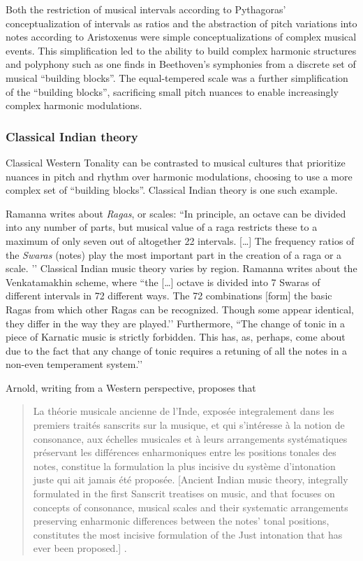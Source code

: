 Both the restriction of musical intervals according to Pythagoras' conceptualization of intervals as ratios and the abstraction of pitch variations into notes according to Aristoxenus were simple conceptualizations of complex musical events. This simplification led to the ability to build complex harmonic structures and polyphony such as one finds in Beethoven's symphonies from a discrete set of musical ``building blocks''. The equal-tempered scale was a further simplification of the ``building blocks'', sacrificing small pitch nuances to enable increasingly complex harmonic modulations. 

\subsubsection{Classical Indian theory}
Classical Western Tonality can be contrasted to musical cultures that prioritize nuances in pitch and rhythm over harmonic modulations, choosing to use a more complex set of ``building blocks''. Classical Indian theory is one such example. 

Ramanna writes about \textit{Ragas}, or scales: ``In principle, an octave can be divided into any number of parts, but musical value of a raga restricts these to a maximum of only seven out of altogether 22 intervals. […] The frequency ratios of the \textit{Swaras} (notes) play the most important part in the creation of a raga or a scale. ’’ \cite[][p.~897]{ramanna1995structure} Classical Indian music theory varies by region. Ramanna writes about the Venkatamakhin scheme, where ``the […] octave is divided into 7 Swaras of different intervals in 72 different ways. The 72 combinations [form] the basic Ragas from which other Ragas can be recognized. Though some appear identical, they differ in the way they are played.’’ \cite[][p.~898]{ramanna1995structure} Furthermore, ``The change of tonic in a piece of Karnatic music is strictly forbidden. This has, as, perhaps, come about due to the fact that any change of tonic requires a retuning of all the notes in a non-even temperament system.’’ \cite[p.~899]{ramanna1995structure}

Arnold, writing from a Western perspective, proposes that \begin{quotation}La théorie musicale ancienne de l'Inde, exposée integralement dans les premiers traités sanscrits sur la musique, et qui s'intéresse à la notion de consonance, aux échelles musicales et à leurs arrangements systématiques préservant les différences enharmoniques entre les positions tonales des notes, constitue la formulation la plus incisive du système d'intonation juste qui ait jamais été proposée. [Ancient Indian music theory, integrally formulated in the first Sanscrit treatises on music, and that focuses on concepts of consonance, musical scales and their systematic arrangements preserving enharmonic differences between the notes’ tonal positions, constitutes the most incisive formulation of the Just intonation that has ever been proposed.] \cite[translated from French][p.~11]{arnold1985intonation}.\end{quotation}

